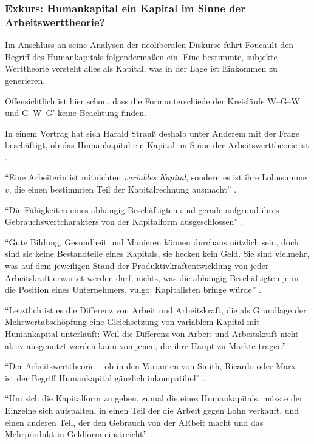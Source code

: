\documentclass[12pt,
               DIV13,
               paper=a4,
               twoside=false,
               onehalfspacing,
               bibliography=totoc,
               toc=graduated,
               draft,
               ]{scrartcl}
\newcommand{\pc}[2]{\parencite[#1]{#2}}
\newcommand{\vgl}[2]{\parencite[vgl.][#1]{#2}}
\newcommand{\gwg}{G--W--G'\xspace}
\newcommand{\wgw}{W--G--W\xspace}
\begin{document}
\newpage

\subsubsection{Exkurs: Humankapital ein Kapital im Sinne der
Arbeitswerttheorie?}

Im Anschluss an seine Analysen der neoliberalen Diskurse führt
Foucault den Begriff des Humankapitals folgendermaßen ein. Eine
bestimmte, subjekte Werttheorie versteht alles als Kapital, was in der
Lage ist Einkommen zu generieren.

Offensichtlich ist hier schon, dass die Formunterschiede der
Kreisläufe \wgw und \gwg keine Beachtung finden.

In einem Vortrag hat sich Harald Strauß deshalb unter Anderem mit der
Frage beschäftigt, ob das Humankapital ein Kapital im Sinne der
Arbeitswerttheorie ist \vgl{}{strauss}.

"`Eine Arbeiterin ist mitnichten \emph{variables Kapital}, sondern es
ist ihre Lohnsumme
$v$, die einen bestimmten Teil der Kapitalrechnung ausmacht"'
\pc{126}{strauss}.

"`Die Fähigkeiten eines abhängig Beschäftigten sind gerade aufgrund
ihres Gebrauchswertcharakters von der Kapitalform ausgeschlossen"'
\pc{126}{strauss}.

"`Gute Bildung, Gesundheit und Manieren können durchaus nützlich sein,
doch sind sie keine Bestandteile eines Kapitals, sie hecken kein Geld.
Sie sind vielmehr, was auf dem jeweiligen Stand der
Produktivkraftentwicklung von jeder Arbeitskraft erwartet werden darf,
nichts, was die abhängig Beschäftigten je in die Position eines
Unternehmers, vulgo: Kapitalisten bringe würde"' \pc{128}{strauss}.

"`Letztlich ist es die Differenz von Arbeit und Arbeitskraft, die als
Grundlage der Mehrwertabschöpfung eine Gleichsetzung von variablem
Kapital mit Humankapital unterläuft: Weil die Differenz von Arbeit und
Arbeitskraft nicht aktiv ausgenutzt werden kann von jenen, die ihre
Haupt zu Markte tragen"' \pc{126}{strauss}

"`Der Arbeitswerttheorie -- ob in den Varianten von Smith, Ricardo
oder Marx -- ist der Begriff Humankapital gänzlich inkompatibel"'
\pc{124}{strauss}.

"`Um sich die Kapitalform zu geben, zumal die eines Humankapitals,
müsste der Einzelne sich aufspalten, in einen Teil der die Arbeit
gegen Lohn verkauft, und einen anderen Teil, der den Gebrauch von der
ARbeit macht und das Mehrprodukt in Geldform einstreicht"'
\pc{126}{strauss}.
\end{document}
